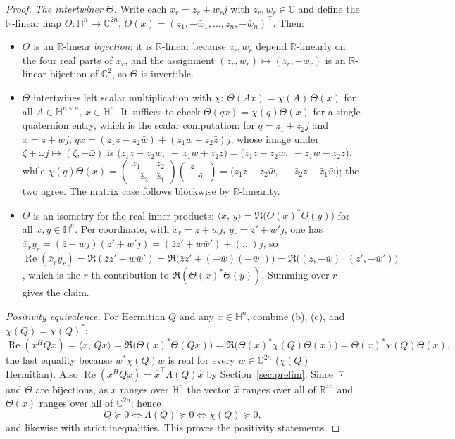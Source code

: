 \documentclass{amsart}
\theoremstyle{definition}
\newcommand{\HH}{\mathbb{H}}
\newcommand{\RR}{\mathbb{R}}
\newcommand{\CC}{\mathbb{C}}
\newcommand{\Real}{\operatorname{Re}}
\newcommand{\inner}[2]{\langle #1,\,#2\rangle}
\begin{document}
\begin{proof}
\emph{The intertwiner $\Theta$.} Write each $x_r=z_r+w_r j$ with
$z_r,w_r\in\CC$ and define the $\RR$-linear map
$\Theta\colon\HH^n\to\CC^{2n}$,
$\Theta(x)=(z_1,-\bar w_1,\dots,z_n,-\bar w_n)^{\!\top}$. Then:
\begin{itemize}
\item[(a)] $\Theta$ is an $\RR$-linear \emph{bijection}: it is
$\RR$-linear because $z_r,w_r$ depend $\RR$-linearly on the four real
parts of $x_r$, and the assignment
$(z_r,w_r)\mapsto(z_r,-\bar w_r)$ is an $\RR$-linear bijection of
$\CC^2$, so $\Theta$ is invertible.
\item[(b)] $\Theta$ intertwines left scalar multiplication with $\chi$:
$\Theta(Ax)=\chi(A)\,\Theta(x)$ for all $A\in\HH^{n\times n}$,
$x\in\HH^n$. It suffices to check $\Theta(qx)=\chi(q)\Theta(x)$ for a
single quaternion entry, which is the scalar computation: for
$q=z_1+z_2j$ and $x=z+wj$,
$qx=(z_1z-z_2\bar w)+(z_1w+z_2\bar z)j$, whose image under
$\zeta+\omega j\mapsto(\zeta,-\bar\omega)$ is
$\bigl(z_1z-z_2\bar w,\;-\,\overline{z_1w+z_2\bar z}\bigr)
=\bigl(z_1z-z_2\bar w,\;-\bar z_1\bar w-\bar z_2 z\bigr)$, while
$\chi(q)\Theta(x)=\left(\begin{smallmatrix}z_1&z_2\\-\bar z_2&\bar z_1\end{smallmatrix}\right)
\left(\begin{smallmatrix}z\\-\bar w\end{smallmatrix}\right)
=\bigl(z_1z-z_2\bar w,\;-\bar z_2 z-\bar z_1\bar w\bigr)$; the two agree.
The matrix case follows blockwise by $\RR$-linearity.
\item[(c)] $\Theta$ is an isometry for the real inner products:
$\inner{x}{y}=\Re\bigl(\Theta(x)^*\Theta(y)\bigr)$ for all
$x,y\in\HH^n$. Per coordinate, with $x_r=z+wj$, $y_r=z'+w'j$, one has
$\bar x_r y_r=(\bar z-wj)(z'+w'j)
=(\bar z z'+w\bar w')+(\dots)j$, so
$\Real(\bar x_r y_r)=\Re(\bar z z'+w\bar w')
=\Re\bigl(\bar z z'+(-\bar w)\overline{(-\bar w')}\bigr)
=\Re\bigl(\overline{(z,-\bar w)}\cdot(z',-\bar w')\bigr)$, which is the
$r$-th contribution to $\Re(\Theta(x)^*\Theta(y))$. Summing over $r$
gives the claim.
\end{itemize}

\emph{Positivity equivalence.} For Hermitian $Q$ and any $x\in\HH^n$,
combine (b), (c), and $\chi(Q)=\chi(Q)^*$:
\[
\Real(x^HQx)=\inner{x}{Qx}
=\Re\bigl(\Theta(x)^*\Theta(Qx)\bigr)
=\Re\bigl(\Theta(x)^*\chi(Q)\Theta(x)\bigr)
=\Theta(x)^*\chi(Q)\Theta(x),
\]
the last equality because $w^*\chi(Q)w$ is real for every
$w\in\CC^{2n}$ ($\chi(Q)$ Hermitian). Also
$\Real(x^HQx)=\widehat x^{\top}\Lambda(Q)\widehat x$ by
Section~\ref{sec:prelim}. Since $\widehat{\,\cdot\,}$ and $\Theta$ are
bijections, as $x$ ranges over $\HH^n$ the vector $\widehat x$ ranges
over all of $\RR^{4n}$ and $\Theta(x)$ ranges over all of $\CC^{2n}$;
hence
\[
Q\succeq0\iff \Lambda(Q)\succeq0\iff \chi(Q)\succeq0,
\]
and likewise with strict inequalities. This proves the positivity
statements.


\end{proof}
\end{document}
